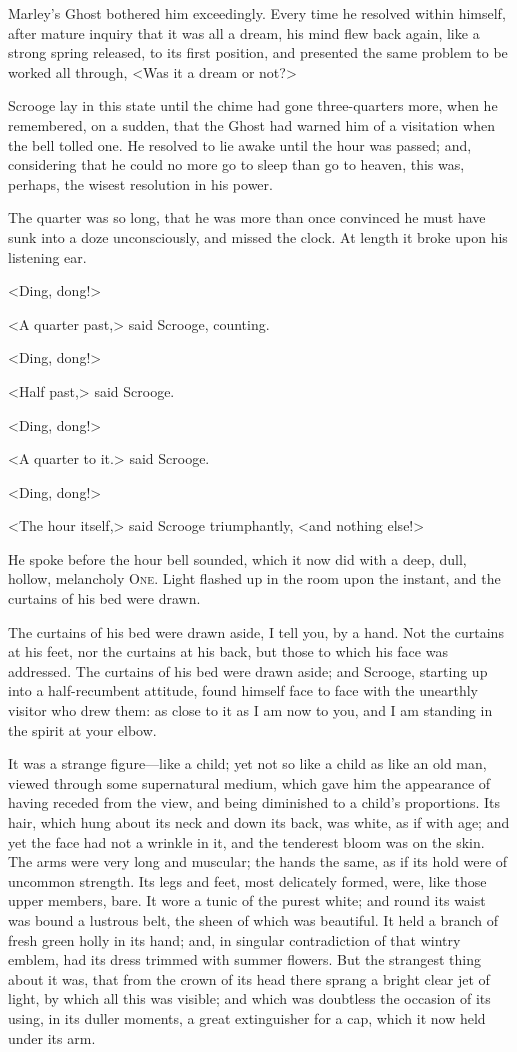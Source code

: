 Marley's Ghost bothered him exceedingly. Every time he resolved within himself,
after mature inquiry that it was all a dream, his mind flew back again, like a
strong spring released, to its first position, and presented the same problem to
be worked all through, <Was it a dream or not?>

Scrooge lay in this state until the chime had gone three-quarters more, when he
remembered, on a sudden, that the Ghost had warned him of a visitation when the
bell tolled one. He resolved to lie awake until the hour was passed; and,
considering that he could no more go to sleep than go to heaven, this was,
perhaps, the wisest resolution in his power.

The quarter was so long, that he was more than once convinced he must have sunk
into a doze unconsciously, and missed the clock. At length it broke upon his
listening ear.

<Ding, dong!>

<A quarter past,> said Scrooge, counting.

<Ding, dong!>

<Half past,> said Scrooge.

<Ding, dong!>

<A quarter to it.> said Scrooge.

<Ding, dong!>

<The hour itself,> said Scrooge triumphantly, <and nothing else!>

He spoke before the hour bell sounded, which it now did with a deep, dull,
hollow, melancholy \textsc{One}. Light flashed up in the room upon the instant,
and the curtains of his bed were drawn.

The curtains of his bed were drawn aside, I tell you, by a hand. Not the
curtains at his feet, nor the curtains at his back, but those to which his face
was addressed. The curtains of his bed were drawn aside; and Scrooge, starting
up into a half-recumbent attitude, found himself face to face with the unearthly
visitor who drew them: as close to it as I am now to you, and I am standing in
the spirit at your elbow.

It was a strange figure—like a child; yet not so like a child as like an old
man, viewed through some supernatural medium, which gave him the appearance of
having receded from the view, and being diminished to a child's proportions. Its
hair, which hung about its neck and down its back, was white, as if with age;
and yet the face had not a wrinkle in it, and the tenderest bloom was on the
skin. The arms were very long and muscular; the hands the same, as if its hold
were of uncommon strength. Its legs and feet, most delicately formed, were, like
those upper members, bare. It wore a tunic of the purest white; and round its
waist was bound a lustrous belt, the sheen of which was beautiful. It held a
branch of fresh green holly in its hand; and, in singular contradiction of that
wintry emblem, had its dress trimmed with summer flowers. But the strangest
thing about it was, that from the crown of its head there sprang a bright clear
jet of light, by which all this was visible; and which was doubtless the
occasion of its using, in its duller moments, a great extinguisher for a cap,
which it now held under its arm.

